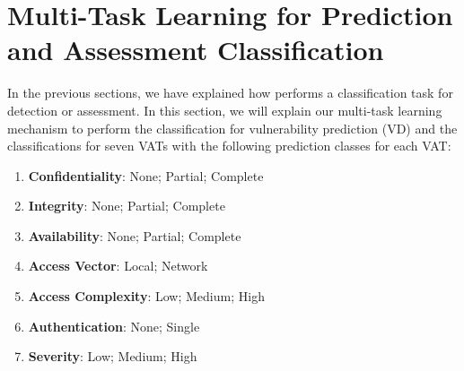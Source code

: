 \section{Multi-Task Learning for Prediction and Assessment Classification}
\label{multi-task:sec}

In the previous sections, we have explained how {\tool} performs a
classification task for detection or assessment.
In this section, we will explain our multi-task learning mechanism to
perform the classification for vulnerability prediction (VD) and the
classifications for seven VATs with the following prediction
classes for each VAT:

\begin{enumerate}
	\item {\bf Confidentiality}: None; Partial; Complete
	\item {\bf Integrity}: None; Partial; Complete
	\item {\bf Availability}: None; Partial; Complete
	\item {\bf Access Vector}: Local; Network
	\item {\bf Access Complexity}: Low; Medium; High
	\item {\bf Authentication}: None; Single
	\item {\bf Severity}: Low; Medium; High
\end{enumerate}



